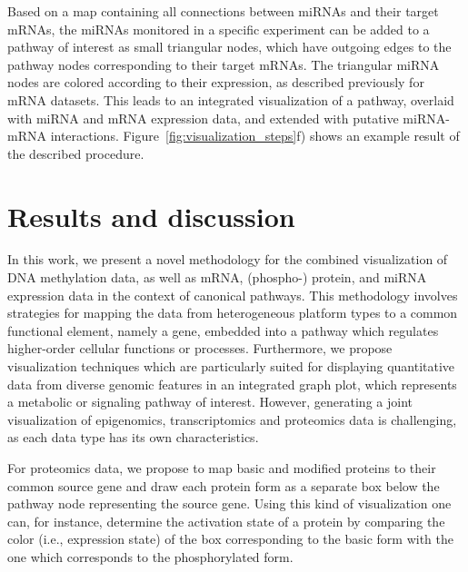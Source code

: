 \documentclass{bioinfo}
\begin{document}
Based on a map containing all connections between miRNAs and their target mRNAs, the miRNAs
monitored in a specific experiment can be added to a pathway of interest as small triangular nodes,
which have outgoing edges to the pathway nodes corresponding to their target mRNAs. The triangular
miRNA nodes are colored according to their expression, as described previously for mRNA datasets.
This leads to an integrated visualization of a pathway, overlaid with miRNA and mRNA expression
data, and extended with putative miRNA-mRNA interactions. Figure~\ref{fig:visualization_steps}f)
shows an example result of the described procedure.


\section{Results and discussion}

In this work, we present a novel methodology for the combined visualization of DNA methylation data,
as well as mRNA, (phospho-) protein, and miRNA expression data in the context of canonical pathways.
This methodology involves strategies for mapping the data from heterogeneous platform types to a common
functional element, namely a gene, embedded into a pathway which regulates higher-order cellular
functions or processes. Furthermore, we propose visualization techniques which are particularly suited for
displaying quantitative data from diverse genomic features in an integrated graph plot,
which represents a metabolic or signaling pathway of interest. However, generating a joint visualization of
epigenomics, transcriptomics and proteomics data is challenging, as each data type has
its own characteristics.

For proteomics data, we propose to map basic and modified proteins to their common source gene and
draw each protein form as a separate box below the pathway node representing the source gene. Using this kind of
visualization one can, for instance, determine the activation state of a protein by comparing the color (i.e., expression state)
of the box corresponding to the basic form with the one which corresponds to the phosphorylated form.
\end{document}
